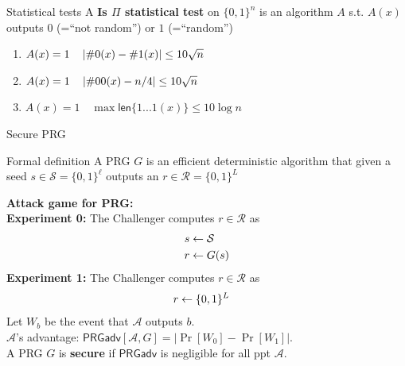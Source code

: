 \documentclass[usenames,dvipsnames, 9pt,aspectratio=169]{beamer}
\begin{document}
\begin{frame}{Statistical tests}
\Large 
A {\color{Orange}\textbf{Is $\Pi$ statistical test}} on $\{0,1\}^n$ is an algorithm $A$ s.t. $A(x)$ outputs $0$ (=``not random'') or $1$ (=``random'') \\[10pt]
\LARGE
\begin{enumerate}
	\item $A(x) = 1 \quad \left\lvert\# 0(x) - \# 1(x)\right\rvert \leq 10 \sqrt{n}$  \\ [10pt]
	\item $A(x) = 1 \quad \left\lvert\# 00(x) - n/4\right\rvert \leq 10 \sqrt{n}$  \\ [10pt]
	\item $A(x) = 1 \quad \max \mathsf{len}\{1...1(x) \} \leq 10 \log n$  \\ [10pt]
\end{enumerate}

\end{frame}

\begin{frame}{Secure PRG}
\Large
	\begin{block}{Formal definition}
	A PRG $G$ is an efficient deterministic algorithm that given a seed $s \in \mathcal{S} = \{0,1\}^{\ell}$ outputs an $r \in \mathcal{R} = \{0,1\}^L$ 
	
\end{block}
	{\color{Orange}\textbf{Attack game for PRG:}} \\
	\vspace{15pt}
	{\color{Orange}\textbf{Experiment 0:}}
	The Challenger computes $r \in \mathcal{R}$ as
	\begin{align*}
		 \Huge	s &\leftarrow \mathcal{S} \\
		 \Huge	r & \leftarrow G(s)
	\end{align*}
	\pause
	{\color{Orange}\textbf{Experiment 1:}}
	The Challenger computes $r \in \mathcal{R}$ as
	\begin{align*}
		 \Huge	r & \leftarrow \{0,1\}^{L}
	\end{align*}
	Let $W_b$ be the event that $\mathcal{A}$ outputs $b$. \\
	 $\mathcal{A}$'s advantage: $	\mathsf{PRGadv} \left[  \mathcal{A}, G \right ] = |\Pr[W_0] - \Pr[W_1]|$. \\[5pt]
	 
	 A PRG $G$ is {\color{Orange}\textbf{secure}} if $	\mathsf{PRGadv}$ is negligible for all ppt $\mathcal{A}$.
	 

\end{frame}
\end{document}
